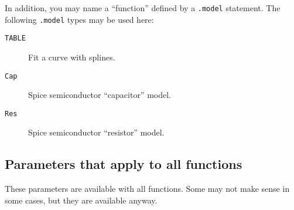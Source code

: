 In addition, you may name a ``function'' defined by a {\tt .model}
statement.  The following {\tt .model} types may be used here:

\begin{description}

\item[{\tt TABLE}] Fit a curve with splines.
\item[{\tt Cap}] Spice semiconductor ``capacitor'' model.
\item[{\tt Res}] Spice semiconductor ``resistor'' model.

\end{description}
\subsection{Parameters that apply to all functions}

These parameters are available with all functions.  Some may not make
sense in some cases, but they are available anyway.

